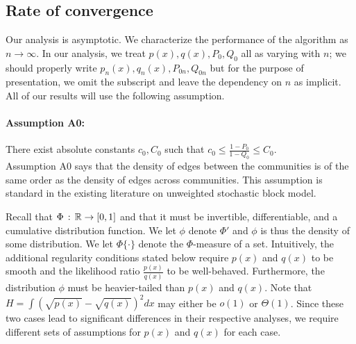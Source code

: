 \documentclass{article}
\begin{document}
\subsection{Rate of convergence}


Our analysis is asymptotic. We characterize the performance of the algorithm as $n \rightarrow \infty$. In our analysis, we treat $p(x), q(x), P_0, Q_0$ all as varying with $n$; we should properly write $p_n(x), q_n(x), P_{0n}, Q_{0n}$ but for the purpose of presentation, we omit the subscript and leave the dependency on $n$ as implicit. All of our results will use the following assumption.

\paragraph{\textbf{Assumption A0:}} There exist absolute constants $c_0, C_0$ such that $c_0 \leq \frac{1-P_0}{1-Q_0} \leq C_0$. \\

Assumption A0 says that the density of edges between the communities is of the same order as the density of edges across communities. This assumption is standard in the existing literature on unweighted stochastic block model. 


Recall that $\Phi \,:\, {\mathbb R} \rightarrow [0,1]$ and that it must be invertible, differentiable, and a cumulative distribution function. We let $\phi$ denote $\Phi'$ and $\phi$ is thus the density of some distribution. We let $\Phi \{ \cdot \}$ denote the $\Phi$-measure of a set. Intuitively, the additional regularity conditions stated below require $p(x)$ and $q(x)$ to be smooth and the likelihood ratio $\frac{p(x)}{q(x)}$ to be well-behaved. Furthermore, the distribution $\phi$ must be heavier-tailed than $p(x)$ and $q(x)$. Note that $H = \int (\sqrt{p(x)} - \sqrt{q(x)})^2 dx$ may either be $o(1)$ or $\Theta(1)$. Since these two cases lead to significant differences in their respective analyses, we require different sets of assumptions for $p(x)$ and $q(x)$ for each case.
\end{document}
